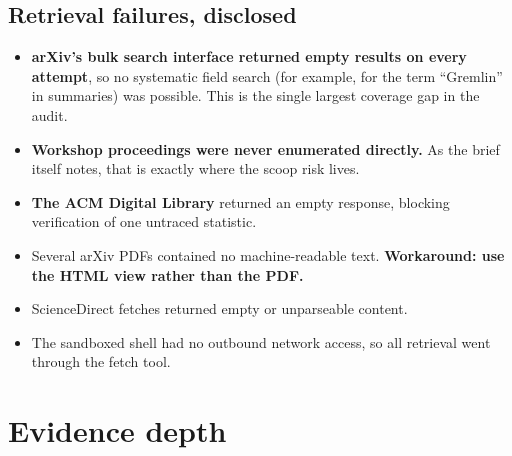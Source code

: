 \documentclass[11pt,a4paper]{article}
\begin{document}
\subsection{Retrieval failures, disclosed}

\begin{itemize}
\item \textbf{arXiv's bulk search interface returned empty results on every attempt},
      so no systematic field search (for example, for the term ``Gremlin'' in
      summaries) was possible. This is the single largest coverage gap in the audit.
\item \textbf{Workshop proceedings were never enumerated directly.} As the brief
      itself notes, that is exactly where the scoop risk lives.
\item \textbf{The ACM Digital Library} returned an empty response, blocking
      verification of one untraced statistic.
\item Several arXiv PDFs contained no machine-readable text. \textbf{Workaround: use
      the HTML view rather than the PDF.}
\item ScienceDirect fetches returned empty or unparseable content.
\item The sandboxed shell had no outbound network access, so all retrieval went
      through the fetch tool.
\end{itemize}

\newpage
\section{Evidence depth}

\begin{center}
\end{center}
\end{document}
